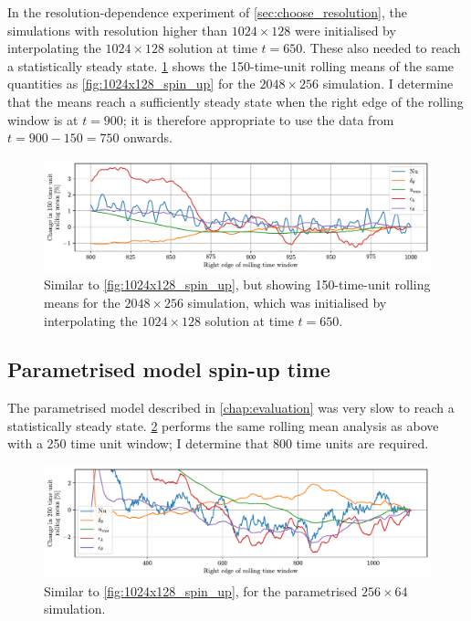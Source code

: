 \documentclass[../main.tex]{subfiles}
\begin{document}
In the resolution-dependence experiment of \cref{sec:choose_resolution}, the
simulations with resolution higher than $1024 \times 128$ were initialised by
interpolating the $1024 \times 128$ solution at time $t = 650$. These also
needed to reach a statistically steady state. \cref{fig:2048x256_spin_up} shows
the 150-time-unit rolling means of the same quantities as
\cref{fig:1024x128_spin_up} for the $2048 \times 256$ simulation. I determine
that the means reach a sufficiently steady state when the right edge of the
rolling window is at $t=900$; it is therefore appropriate to use the data
from $t=900-150=750$ onwards.
\begin{figure}[ht]
    \centering
    \includegraphics[width=\linewidth]{figures/2048x256_spin_up.pdf}
    \caption{
        Similar to \cref{fig:1024x128_spin_up}, but showing 150-time-unit
        rolling means for the $2048 \times 256$ simulation, which was
        initialised by interpolating the $1024 \times 128$ solution at time
        $t=650$.
    }
    \label{fig:2048x256_spin_up}
\end{figure}

\subsection{Parametrised model spin-up time} \label{sec:parametrised_spinup}
The parametrised model described in \cref{chap:evaluation} was very slow
to reach a statistically steady state. \cref{fig:parametrised_spin_up} performs
the same rolling mean analysis as above with a 250 time unit window;
I determine that 800 time units are required.

\begin{figure}[ht]
    \centering
    \includegraphics[width=\linewidth]{figures/parametrised_spin_up.pdf}
    \caption{
        Similar to \cref{fig:1024x128_spin_up}, for the parametrised
        $256 \times 64$ simulation.
    }
    \label{fig:parametrised_spin_up}
\end{figure}
\end{document}
